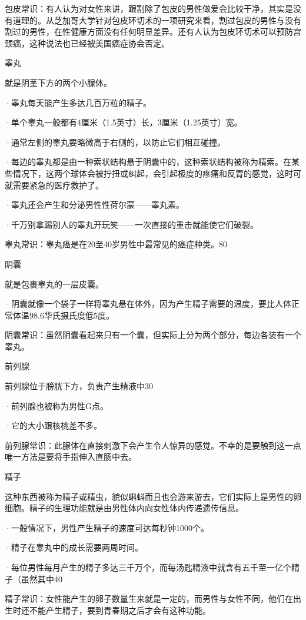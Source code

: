 \documentclass[12pt,UTF8,openany]{ctexbook}
\begin{document}
包皮常识：有人认为对女性来讲，跟割除了包皮的男性做爱会比较干净，其实是没有道理的。从芝加哥大学针对包皮环切术的一项研究来看，割过包皮的男性与没有割过的男性，在性健康方面没有任何明显差异。还有人认为包皮环切术可以预防宫颈癌，这种说法也已经被美国癌症协会否定。

睾丸

就是阴茎下方的两个小腺体。

·睾丸每天能产生多达几百万粒的精子。

·单个睾丸一般都有4厘米（1.5英寸）长，3厘米（1.25英寸）宽。

·通常左侧的睾丸要略微高于右侧的，以防止它们相互碰撞。

·每边的睾丸都是由一种索状结构悬于阴囊中的，这种索状结构被称为精索。在某些情况下，这两个球体会被拧扭或纠起，会引起极度的疼痛和反胃的感觉，这时可就需要紧急的医疗救护了。

·睾丸还会产生和分泌男性性荷尔蒙——睾丸素。

·千万别拿踢别人的睾丸开玩笑——一次直接的重击就能使它们破裂。

睾丸常识：睾丸癌是在20至40岁男性中最常见的癌症种类。80%

阴囊

就是包裹睾丸的一层皮囊。

·阴囊就像一个袋子一样将睾丸悬在体外，因为产生精子需要的温度，要比人体正常体温98.6华氏摄氏度低5度。

阴囊常识：虽然阴囊看起来只有一个囊，但实际上分为两个部分，每边各装有一个睾丸。

前列腺

前列腺位于膀胱下方，负责产生精液中30%

·前列腺也被称为男性G点。

·它的大小跟核桃差不多。

前列腺常识：此腺体在直接刺激下会产生令人惊异的感觉。不幸的是要触到这一点唯一方法是要将手指伸入直肠中去。

精子

这种东西被称为精子或精虫，貌似蝌蚪而且也会游来游去，它们实际上是男性的卵细胞。精子的生理功能就是由男性体内向女性体内传递遗传信息。

·一般情况下，男性产生精子的速度可达每秒钟1000个。

·精子在睾丸中的成长需要两周时间。

·每位男性每月产生的精子多达三千万个，而每汤匙精液中就含有五千至一亿个精子（虽然其中40%

精子常识：女性能产生的卵子数量生来就是一定的，而男性与女性不同，他们在出生时还不能产生精子，要到青春期之后才会有这种功能。
\end{document}
